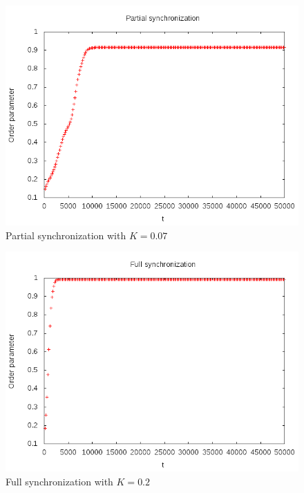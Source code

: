 \documentclass[12pt]{article}
\begin{document}
\begin{figure}
\centering
\includegraphics[scale=0.5]{data/partialmore}
\caption{Partial synchronization with $K=0.07$}
\label{fig:plot:partial2}
\end{figure}

\begin{figure}
\centering
\includegraphics[scale=0.5]{data/full}
\caption{Full synchronization with $K=0.2$}
\label{fig:plot:full1}
\end{figure}



\end{document}
